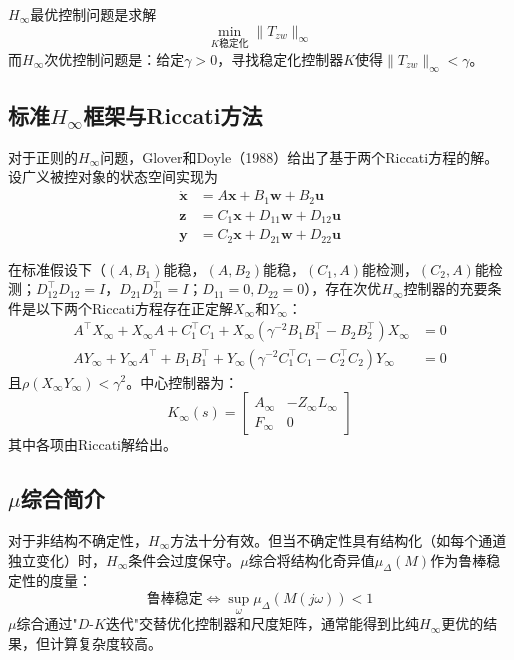 \(H_{\infty}\)最优控制问题是求解
\[
\min_{K\text{稳定化}} \|T_{zw}\|_{\infty}
\]
而\(H_{\infty}\)次优控制问题是：给定\(\gamma > 0\)，寻找稳定化控制器\(K\)使得\(\|T_{zw}\|_{\infty} < \gamma\)。

\subsection{标准\(H_{\infty}\)框架与Riccati方法}

对于正则的\(H_{\infty}\)问题，Glover和Doyle（1988）给出了基于两个Riccati方程的解。设广义被控对象的状态空间实现为
\begin{align*}
\dot{\mathbf{x}} &= A\mathbf{x} + B_1\mathbf{w} + B_2\mathbf{u} \\
\mathbf{z} &= C_1\mathbf{x} + D_{11}\mathbf{w} + D_{12}\mathbf{u} \\
\mathbf{y} &= C_2\mathbf{x} + D_{21}\mathbf{w} + D_{22}\mathbf{u}
\end{align*}

在标准假设下（\((A,B_1)\)能稳，\((A,B_2)\)能稳，\((C_1,A)\)能检测，\((C_2,A)\)能检测；\(D_{12}^{\top}D_{12} = I\)，\(D_{21}D_{21}^{\top} = I\)；\(D_{11}=0, D_{22}=0\)），存在次优\(H_{\infty}\)控制器的充要条件是以下两个Riccati方程存在正定解\(X_{\infty}\)和\(Y_{\infty}\)：
\begin{align*}
A^{\top}X_{\infty} + X_{\infty}A + C_1^{\top}C_1 + X_{\infty}(\gamma^{-2}B_1B_1^{\top} - B_2B_2^{\top})X_{\infty} &= 0 \\
AY_{\infty} + Y_{\infty}A^{\top} + B_1B_1^{\top} + Y_{\infty}(\gamma^{-2}C_1^{\top}C_1 - C_2^{\top}C_2)Y_{\infty} &= 0
\end{align*}
且\(\rho(X_{\infty}Y_{\infty}) < \gamma^2\)。中心控制器为：
\[
K_{\infty}(s) = \begin{bmatrix} A_{\infty} & -Z_{\infty}L_{\infty} \\ F_{\infty} & 0 \end{bmatrix}
\]
其中各项由Riccati解给出。

\subsection{\(\mu\)综合简介}

对于非结构不确定性，\(H_{\infty}\)方法十分有效。但当不确定性具有结构化（如每个通道独立变化）时，\(H_{\infty}\)条件会过度保守。\(\mu\)综合将结构化奇异值\(\mu_{\Delta}(M)\)作为鲁棒稳定性的度量：
\[
\text{鲁棒稳定} \iff \sup_{\omega} \mu_{\Delta}(M(j\omega)) < 1
\]
\(\mu\)综合通过"\(D\)-\(K\)迭代"交替优化控制器和尺度矩阵，通常能得到比纯\(H_{\infty}\)更优的结果，但计算复杂度较高。

